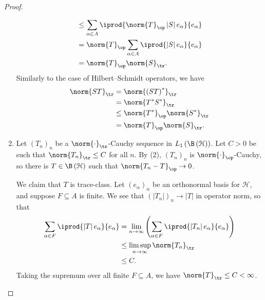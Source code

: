 \documentclass[10pt]{mypackage}
\begin{document}
\begin{proof}
\begin{enumerate}[(1)]
\begin{align*}
                        &\leq \sum_{\alpha\in A} \iprod{\norm{T}_{\op} \left\vert S \right\vert e_{\alpha}}{e_{\alpha}}\\
                        &= \norm{T}_{\op}\sum_{\alpha \in A} \iprod{\left\vert S \right\vert e_{\alpha}}{e_{\alpha}}\\
                        &= \norm{T}_{\op}\norm{S}_{\tr}.
      \end{align*}
      Similarly to the case of Hilbert--Schmidt operators, we have
      \begin{align*}
        \norm{ST}_{\tr} &= \norm{\left( ST \right)^{\ast}}_{\tr}\\
                        &= \norm{T^{\ast}S^{\ast}}_{\tr}\\
                        &\leq \norm{T^{\ast}}_{\op}\norm{S^{\ast}}_{\tr}\\
                        &= \norm{T}_{\op}\norm{S}_{\tr}.
      \end{align*}
    \item Let $\left( T_n \right)_n$ be a $\norm{\cdot}_{\tr}$-Cauchy sequence in $L_1\left( \B\left( \mathcal{H} \right) \right)$. Let $C > 0$ be such that $\norm{T_n}_{\tr} \leq C$ for all $n$. By (2), $\left( T_n \right)_n$ is $\norm{\cdot}_{\op}$-Cauchy, so there is $T\in \B\left( \mathcal{H} \right)$ such that $\norm{T_n - T}_{\op}\rightarrow 0$.\newline

      We claim that $T$ is trace-class. Let $\left( e_{\alpha} \right)_{\alpha}$ be an orthonormal basis for $\mathcal{H}$, and suppose $F\subseteq A$ is finite. We see that $\left( \left\vert T_n \right\vert \right)_{n}\rightarrow \left\vert T \right\vert$ in operator norm, so that
      \begin{align*}
        \sum_{\alpha \in F} \iprod{\left\vert T \right\vert e_{\alpha}}{e_{\alpha}} &= \lim_{n\rightarrow\infty} \left( \sum_{\alpha \in F} \iprod{\left\vert T_n \right\vert e_{\alpha}}{e_{\alpha}} \right)\\
                                                                                    &\leq \limsup_{n\rightarrow\infty} \norm{T_n}_{\tr}\\
                                                                                    &\leq C.
      \end{align*}
      Taking the supremum over all finite $F\subseteq A$, we have $\norm{T}_{\tr} \leq C < \infty$.\newline


\end{enumerate}
\end{proof}
\end{document}
